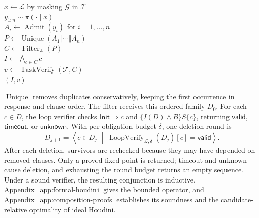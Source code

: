 \begin{algorithm}[H]
\caption{Rollout--decompose--pool--filter--compose}
\label{alg:method-pipeline}
\begin{algorithmic}
\algline \(x\leftarrow\mathcal L\) by masking \(\mathcal G\) in \(\mathcal T\)\\
\algline \(y_{1:n}\sim\pi(\cdot\mid x)\)\\
\algline \(A_i\leftarrow\operatorname{Admit}(y_i)\) for \(i=1,\ldots,n\)
  \\
\algline \(P\leftarrow\operatorname{Unique}(A_1\Vert\cdots\Vert A_n)\)
  \\
\algline \(C\leftarrow\operatorname{Filter}_{\mathcal L}(P)\)\\
\algline \(I\leftarrow\bigwedge_{c\in C}c\)\\
\algline \(v\leftarrow\operatorname{TaskVerify}(\mathcal T,C)\)\\
\algline {} \((I,v)\)\\
\end{algorithmic}
\end{algorithm}

\(\operatorname{Unique}\) removes duplicates conservatively, keeping the first
occurrence in response and clause order.  The filter receives this ordered
family \(D_0\).  For each \(c\in D\), the loop verifier checks
\(\mathsf{Init}\Rightarrow c\) and \(\{I(D)\wedge B\}S\{c\}\), returning
\(\mathsf{valid}\), \(\mathsf{timeout}\), or \(\mathsf{unknown}\).
With per-obligation budget \(\delta\), one deletion round is
\begin{equation}
 D_{j+1}=\left\langle c\in D_j\;\middle|\;
 \operatorname{LoopVerify}_{\mathcal L,\delta}(D_j)[c]=\mathsf{valid}
 \right\rangle.
 \label{eq:main-houdini-round}
\end{equation}
After each deletion, survivors are rechecked because they may have depended
on removed clauses.  Only a proved fixed point is returned; timeout and
unknown cause deletion, and exhausting the round budget returns an empty
sequence.  Under a sound verifier, the resulting conjunction is inductive.
Appendix~\ref{app:formal-houdini} gives the bounded operator, and
Appendix~\ref{app:composition-proofs} establishes its soundness and the
candidate-relative optimality of ideal Houdini.

